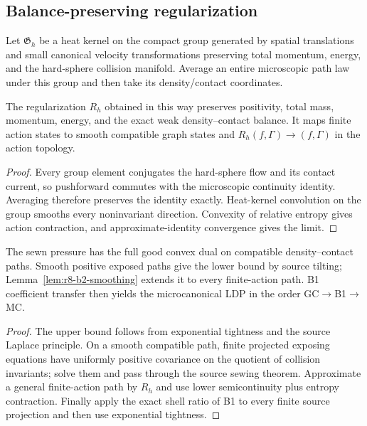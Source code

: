 \subsection{Balance-preserving regularization}

Let $\mathfrak G_h$ be a heat kernel on the compact group generated by spatial
translations and small canonical velocity transformations preserving total
momentum, energy, and the hard-sphere collision manifold.  Average an entire
microscopic path law under this group and then take its density/contact
coordinates.

\begin{lemma}
\label{lem:r8-b2-smoothing}
The regularization $R_h$ obtained in this way preserves positivity, total mass,
momentum, energy, and the exact weak density--contact balance.  It maps finite
action states to smooth compatible graph states and
$R_h(f,\Gamma)\to(f,\Gamma)$ in the action topology.
\end{lemma}

\begin{proof}
Every group element conjugates the hard-sphere flow and its contact current,
so pushforward commutes with the microscopic continuity identity.  Averaging
therefore preserves the identity exactly.  Heat-kernel convolution on the
group smooths every noninvariant direction.  Convexity of relative entropy
gives action contraction, and approximate-identity convergence gives the
limit.
\end{proof}

\begin{theorem}
\label{thm:r8-b2-ldp}
The sewn pressure has the full good convex dual on compatible density--contact
paths.  Smooth positive exposed paths give the lower bound by source tilting;
Lemma~\ref{lem:r8-b2-smoothing} extends it to every finite-action path.  B1
coefficient transfer then yields the microcanonical LDP in the order
GC$\to$B1$\to$MC.
\end{theorem}

\begin{proof}
The upper bound follows from exponential tightness and the source Laplace
principle.  On a smooth compatible path, finite projected exposing equations
have uniformly positive covariance on the quotient of collision invariants;
solve them and pass through the source sewing theorem.  Approximate a general
finite-action path by $R_h$ and use lower semicontinuity plus entropy
contraction.  Finally apply the exact shell ratio of B1 to every finite source
projection and then use exponential tightness.
\end{proof}
